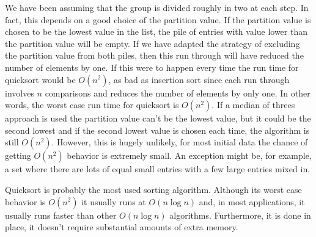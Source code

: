 \documentclass[11pt,a4paper]{scrartcl}
\begin{document}
We have been assuming that the group is divided roughly in two at each
step. In fact, this depends on a good choice of the partition
value. If the partition value is chosen to be the lowest value in the
list, the pile of entries with value lower than the partition value
will be empty. If we have adapted the strategy of excluding the
partition value from both piles, then this run through will have
reduced the number of elements by one. If this were to happen every
time the run time for quicksort would be $O(n^2)$, as bad as insertion
sort since each run through involves $n$ comparisons and reduces the
number of elements by only one. In other words, the worst case run
time for quicksort is $O(n^2)$. If a median of threes approach is used
the partition value can't be the lowest value, but it could be the
second lowest and if the second lowest value is chosen each time, the
algorithm is still $O(n^2)$. However, this is hugely unlikely, for
most initial data the chance of getting $O(n^2)$ behavior is extremely
small. An exception might be, for example, a set where there are lots
of equal small entries with a few large entries mixed in.

Quicksort is probably the most used sorting algorithm. Although its
worst case behavior is $O(n^2)$ it usually runs at $O(n\log{n})$ and,
in most applications, it usually runs faster than other $O(n\log{n})$
algorithms. Furthermore, it is done in place, it doesn't require
substantial amounts of extra memory.
\end{document}
